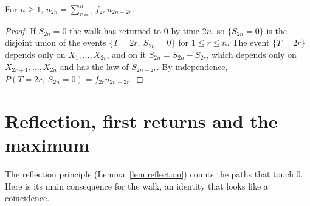 \begin{lemma}\label{lem:renewal}
For $n\ge1$, $u_{2n}=\sum_{r=1}^nf_{2r}\,u_{2n-2r}$.
\end{lemma}
\begin{proof}
If $S_{2n}=0$ the walk has returned to $0$ by time $2n$, so $\{S_{2n}=0\}$ is the disjoint union of the events
$\{T=2r,\ S_{2n}=0\}$ for $1\le r\le n$. The event $\{T=2r\}$ depends only on $X_1,\dots,X_{2r}$, and on it $S_{2n}=S_{2n}-S_{2r}$, which
depends only on $X_{2r+1},\dots,X_{2n}$ and has the law of $S_{2n-2r}$. By independence, $P(T=2r,\ S_{2n}=0)=f_{2r}u_{2n-2r}$.
\end{proof}

\section{Reflection, first returns and the maximum}

The reflection principle (Lemma~\ref{lem:reflection}) counts the paths that touch $0$. Here is its main consequence for
the walk, an identity that looks like a coincidence.


